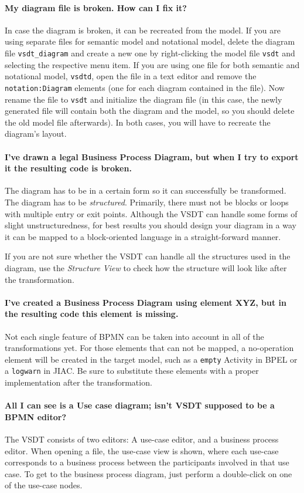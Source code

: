 \paragraph*{My diagram file is broken. How can I fix it?}
In case the diagram is broken, it can be recreated from the model.  If you
are using separate files for semantic model and notational model, delete the
diagram file \texttt{vsdt\_diagram} and create a new one by right-clicking the
model file \texttt{vsdt} and selecting the respective menu item.  If you are
using one file for both semantic and notational model, \texttt{vsdtd}, open the
file in a text editor and remove the \texttt{notation:Diagram} elements (one for
each diagram contained in the file).  Now rename the file to \texttt{vsdt} and
initialize the diagram file (in this case, the newly generated file will contain
both the diagram and the model, so you should delete the old model file afterwards).
In both cases, you will have to recreate the diagram's layout.


\paragraph*{I've drawn a legal Business Process Diagram, but when I try to export
it the resulting code is broken.}
The diagram has to be in a certain form so it can successfully be transformed.
The diagram has to be \emph{structured}.  Primarily, there must not be blocks or
loops with multiple entry or exit points.  Although the VSDT can handle some forms
of slight unstructuredness, for best results you should design your diagram in a
way it can be mapped to a block-oriented language in a straight-forward manner.

If you are not sure whether the VSDT can handle all the structures used in the
diagram, use the \emph{Structure View} to check how the structure will look like
after the transformation.


\paragraph*{I've created a Business Process Diagram using element XYZ, but in the
resulting code this element is missing.}
Not each single feature of BPMN can be taken into account in all of the
transformations yet.  For those elements that can not be mapped, a no-operation
element will be created in the target model, such as a \verb_empty_ Activity in
BPEL or a \verb_logwarn_ in JIAC.  Be sure to substitute these elements with a
proper implementation after the transformation.

\paragraph*{All I can see is a Use case diagram; isn't VSDT supposed to be a BPMN editor?}
The VSDT consists of two editors: A use-case editor, and a business process editor. 
When opening a file, the use-case view is shown, where each use-case corresponds to 
a business process between the participants involved in that use case. To get to the 
business process diagram, just perform a double-click on one of the use-case nodes.
